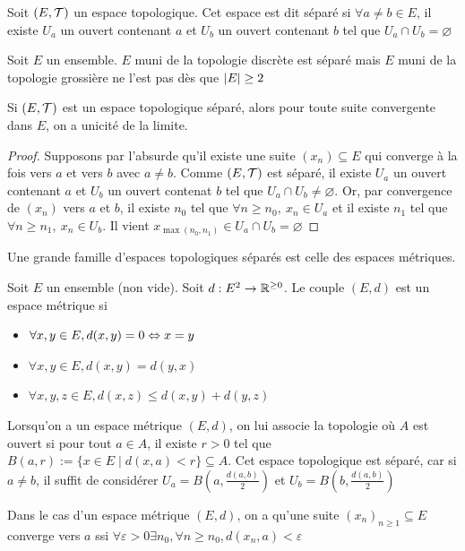 \begin{definition}
    Soit $(E,\mathcal{T})$ un espace topologique. Cet espace est dit séparé si $\forall a\ne b\in E$, il existe $U_a$ un ouvert contenant $a$ et $U_b$  un ouvert contenant $b$ tel que $U_a\cap U_b = \varnothing$ 
\end{definition}
\begin{exemple}
    Soit $E$ un ensemble. $E$ muni de la topologie discrète est séparé mais $E$ muni de la topologie grossière ne l'est pas dès que $\left| E \right|\ge 2$
\end{exemple}
\begin{proposition}
Si $(E,\mathcal{T})$ est un espace topologique séparé, alors pour toute suite convergente dans $E$, on a unicité de la limite.
\end{proposition}
\begin{proof}
    Supposons par l'absurde qu'il existe une suite $(x_n)\subseteq E$ qui converge à la fois vers $a$ et vers $b$ avec $a\ne b$. Comme $(E,\mathcal{T})$ est séparé, il existe $U_a$ un ouvert contenant $a$ et $U_b$ un ouvert contenat $b$ tel que $U_a\cap U_b\ne\varnothing$. Or, par convergence de $(x_n)$ vers $a$ et $b$, il existe $n_0$ tel que $\forall n\ge n_0,\ x_n\in U_a$ et il existe $n_1$ tel que $\forall n\ge n_1,\ x_n\in U_b$. Il vient $x_{\max(n_0,n_1)}\in U_a\cap U_b=\varnothing$
\end{proof}
Une grande famille d'espaces topologiques séparés est celle des espaces métriques.
\begin{definition}
    Soit $E$ un ensemble (non vide). Soit $d:E^2\to \mathbb{R}^{\ge0}$. Le couple $(E,d)$ est un espace métrique si \begin{itemize}
        \item $\forall x,y\in E, d(x,y) = 0\Leftrightarrow x=y$
        \item $\forall x,y\in E, d(x,y) = d(y,x)$
        \item $\forall x,y,z\in E, d(x,z)\le d(x,y) + d(y,z)$
    \end{itemize}
\end{definition}
\begin{definition}
    Lorsqu'on a un espace métrique $(E,d)$, on lui associe la topologie où $A$ est ouvert si pour tout $a\in A$, il existe $r>0$ tel que $B(a,r):=\{x\in E\mid d(x,a)<r\}\subseteq A$. Cet espace topologique est séparé, car si $a\ne b$, il suffit de considérer $U_a = B\left(a,\frac{d(a,b)}2\right)$ et $U_b = B\left(b,\frac{d(a,b)}2\right)$
    \end{definition}
    \begin{proposition}
        Dans le cas d'un espace métrique $(E,d)$, on a qu'une suite $(x_n)_{n\ge 1}\subseteq E$ converge vers $a$ ssi $\forall\varepsilon > 0\exists n_0,\forall n\ge n_0, d(x_n,a)<\varepsilon$
    \end{proposition}
